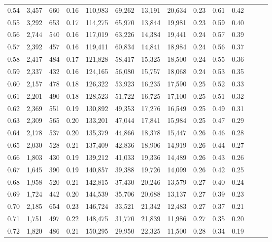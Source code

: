 \begin{tabular}{rrrrrrrrrrrrrr}
0.54 &  3,457 &  660 &  0.16 &  110,983 &   69,262 &  13,191 &  20,634 &  0.23 &  0.61 &      0.42 \\
0.55 &  3,292 &  653 &  0.17 &  114,275 &   65,970 &  13,844 &  19,981 &  0.23 &  0.59 &      0.40 \\
0.56 &  2,744 &  540 &  0.16 &  117,019 &   63,226 &  14,384 &  19,441 &  0.24 &  0.57 &      0.39 \\
0.57 &  2,392 &  457 &  0.16 &  119,411 &   60,834 &  14,841 &  18,984 &  0.24 &  0.56 &      0.37 \\
0.58 &  2,417 &  484 &  0.17 &  121,828 &   58,417 &  15,325 &  18,500 &  0.24 &  0.55 &      0.36 \\
0.59 &  2,337 &  432 &  0.16 &  124,165 &   56,080 &  15,757 &  18,068 &  0.24 &  0.53 &      0.35 \\
0.60 &  2,157 &  478 &  0.18 &  126,322 &   53,923 &  16,235 &  17,590 &  0.25 &  0.52 &      0.33 \\
0.61 &  2,201 &  490 &  0.18 &  128,523 &   51,722 &  16,725 &  17,100 &  0.25 &  0.51 &      0.32 \\
0.62 &  2,369 &  551 &  0.19 &  130,892 &   49,353 &  17,276 &  16,549 &  0.25 &  0.49 &      0.31 \\
0.63 &  2,309 &  565 &  0.20 &  133,201 &   47,044 &  17,841 &  15,984 &  0.25 &  0.47 &      0.29 \\
0.64 &  2,178 &  537 &  0.20 &  135,379 &   44,866 &  18,378 &  15,447 &  0.26 &  0.46 &      0.28 \\
0.65 &  2,030 &  528 &  0.21 &  137,409 &   42,836 &  18,906 &  14,919 &  0.26 &  0.44 &      0.27 \\
0.66 &  1,803 &  430 &  0.19 &  139,212 &   41,033 &  19,336 &  14,489 &  0.26 &  0.43 &      0.26 \\
0.67 &  1,645 &  390 &  0.19 &  140,857 &   39,388 &  19,726 &  14,099 &  0.26 &  0.42 &      0.25 \\
0.68 &  1,958 &  520 &  0.21 &  142,815 &   37,430 &  20,246 &  13,579 &  0.27 &  0.40 &      0.24 \\
0.69 &  1,724 &  442 &  0.20 &  144,539 &   35,706 &  20,688 &  13,137 &  0.27 &  0.39 &      0.23 \\
0.70 &  2,185 &  654 &  0.23 &  146,724 &   33,521 &  21,342 &  12,483 &  0.27 &  0.37 &      0.21 \\
0.71 &  1,751 &  497 &  0.22 &  148,475 &   31,770 &  21,839 &  11,986 &  0.27 &  0.35 &      0.20 \\
0.72 &  1,820 &  486 &  0.21 &  150,295 &   29,950 &  22,325 &  11,500 &  0.28 &  0.34 &      0.19 \\

\end{tabular}
